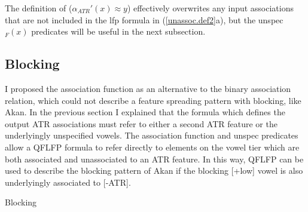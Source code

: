 \documentclass[,doc,floatsintext]{apa6}
\theoremstyle{definition}
\theoremstyle{definition}
\theoremstyle{definition}
\theoremstyle{remark}
\begin{document}
\noindent The definition of (\(\alpha_{ATR}'(x)\approx y\)) effectively
overwrites any input associations that are not included in the lfp
formula in (\ref{unassoc.def2}a), but the unspec\(_F(x)\) predicates
will be useful in the next subsection.

\subsection{Blocking}\label{blocking-1}

I proposed the association function as an alternative to the binary
association relation, which could not describe a feature spreading
pattern with blocking, like Akan. In the previous section I explained
that the formula which defines the output ATR associations must refer to
either a second ATR feature or the underlyingly unspecified vowels. The
association function and unspec predicates allow a QFLFP formula to
refer directly to elements on the vowel tier which are both associated
and unassociated to an ATR feature. In this way, QFLFP can be used to
describe the blocking pattern of Akan if the blocking {[}+low{]} vowel
is also underlyingly associated to {[}-ATR{]}.

\begin{exe}
  \ex \label{block.unspec} Blocking\\
\end{exe}
\end{document}
